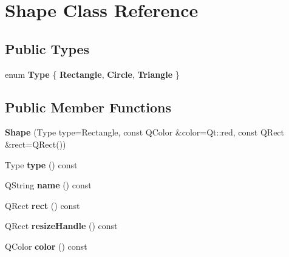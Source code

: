 \hypertarget{class_shape}{\section{Shape Class Reference}
\label{class_shape}
}
\subsection*{Public Types}
\begin{DoxyCompactItemize}
\item 
enum {\bfseries Type} \{ {\bfseries Rectangle}, 
{\bfseries Circle}, 
{\bfseries Triangle}
 \}
\end{DoxyCompactItemize}
\subsection*{Public Member Functions}
\begin{DoxyCompactItemize}
\item 
\hypertarget{class_shape_a2cde43076679f6e76202ecd95621e4e1}{{\bfseries Shape} (Type type=Rectangle, const Q\-Color \&color=Qt\-::red, const Q\-Rect \&rect=Q\-Rect())}\label{class_shape_a2cde43076679f6e76202ecd95621e4e1}

\item 
\hypertarget{class_shape_a8fd8566d38802daf8808c3a47425c3a6}{Type {\bfseries type} () const }\label{class_shape_a8fd8566d38802daf8808c3a47425c3a6}

\item 
\hypertarget{class_shape_a1f749dd63c9a1ec038c56339b2cac425}{Q\-String {\bfseries name} () const }\label{class_shape_a1f749dd63c9a1ec038c56339b2cac425}

\item 
\hypertarget{class_shape_a8077417c3eac47f09de23f03127ca876}{Q\-Rect {\bfseries rect} () const }\label{class_shape_a8077417c3eac47f09de23f03127ca876}

\item 
\hypertarget{class_shape_a5ed4b7121904ce993c0361fa4c032639}{Q\-Rect {\bfseries resize\-Handle} () const }\label{class_shape_a5ed4b7121904ce993c0361fa4c032639}

\item 
\hypertarget{class_shape_a145b22efa7f3434da3a1cb6a885d65b4}{Q\-Color {\bfseries color} () const }\label{class_shape_a145b22efa7f3434da3a1cb6a885d65b4}

\end{DoxyCompactItemize}
